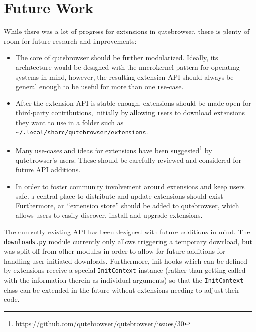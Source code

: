 \section{Future Work}
While there was a lot of progress for extensions in qutebrowser, there is plenty
of room for future research and improvements:

\begin{itemize}
  \item The core of qutebrowser should be further modularized. Ideally, its
    architecture would be designed with the microkernel pattern \autocite[171ff]{posa1}
    for operating systems in mind, however, the resulting extension API should
    always be general enough to be useful for more than one use-case.
  \item After the extension API is stable enough, extensions should be made open
    for third-party contributions, initially by allowing users to download
    extensions they want to use in a folder such as
    \verb|~/.local/share/qutebrowser/extensions|.
  \item Many use-cases and ideas for extensions have been
    suggested\footnote{\url{https://github.com/qutebrowser/qutebrowser/issues/30}}
    by qutebrowser's users. These should be carefully reviewed and considered
    for future API additions.
  \item In order to foster community involvement around extensions and keep
    users safe, a central place to distribute and update extensions should
    exist. Furthermore, an ``extension store'' should be added to qutebrowser,
    which allows users to easily discover, install and upgrade extensions.
\end{itemize}

The currently existing API has been designed with future additions in mind: The
\verb|downloads.py| module currently only allows triggering a temporary
download, but was split off from other modules in order to allow for future
additions for handling user-initiated downloads. Furthermore, init-hooks which
can be defined by extensions receive a special \verb|InitContext| instance
(rather than getting called with the information therein as individual
arguments) so that the \verb|InitContext| class can be extended in the future
without extensions needing to adjust their code.

